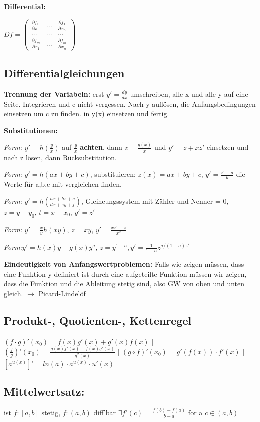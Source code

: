 \documentclass[a3paper, ngerman, 8pt]{article}
\begin{document}
\begin{multicols*}{3}
\textbf{Differential:}

$Df=\begin{pmatrix}
\frac{\partial f_1}{\partial x_1} & ... & \frac{\partial f_1}{\partial x_n}\\
... & ...& ...\\
\frac{\partial f_m}{\partial x_1} & ... & \frac{\partial f_m}{\partial x_n}
\end{pmatrix}$


\subsection*{Differentialgleichungen}
\textbf{Trennung der Variabeln:} erst $y'=\frac{dy}{dx}$ umschreiben, alle x und alle y auf eine Seite. Integrieren und c nicht vergessen. Nach y auflösen, die Anfangsbedingungen einsetzen um c zu finden. in y(x) einsetzen und fertig. 

\textbf{Substitutionen:} 

\textit{Form:} $y'=h(\frac{y}{x})$ auf $\frac{y}{x}$ \textbf{achten}, dann $z=\frac{y(x)}{x}$ und $y'=z+xz'$ einsetzen und nach z lösen, dann Rücksubstitution. 

\textit{Form:} $y'=h(ax+by+c)$, substituieren: $z(x)=ax+by+c$, $y'=\frac{z'-a}{b}$ die Werte für a,b,c mit vergleichen finden. 

\textit{Form:} $y'=h(\frac{ax+bx+c}{dx+ey+f})$, Gleihcungssystem mit Zähler und Nenner = 0, $z=y-y_0$, $t=x-x_0$, $y'=z'$

\textit{Form:} $y'=\frac{x}{y}h(xy)$, $z=xy$, $y'=\frac{xz'-z}{x^2}$

\textit{Form:}$y'=h(x)y+g(x)y^a$, $z=y^{1-a}, y'=\frac{1}{1-a}z^{a/(1-a)z'}$

\textbf{Eindeutigkeit von Anfangswertproblemen:} Falls wie zeigen müssen, dass eine Funktion y definiert ist durch eine aufgeteilte Funktion müssen wir zeigen, dass die Funktion und die Ableitung stetig sind, also GW von oben und unten gleich. $\to$ Picard-Lindelöf


\subsection*{Produkt-, Quotienten-, Kettenregel} $(f\cdot g)'(x_0) = f(x)g'(x)+g'(x)f(x)$ $\big \vert$  $(\frac{f}{g})'(x_0) = \frac{g(x)f'(x)-f(x)g'(x)}{g^2(x)}$ $\big \vert$ $(g\circ f)'(x_0)=g'(f(x))\cdot f'(x)$ $\big \vert$ $[a^{u(x)}]'= ln(a)\cdot a^{u(x)}\cdot u'(x)$

\subsection*{Mittelwertsatz:} ist $f: [a,b]$ stetig, $f:(a,b)$ diff'bar $\exists f'(c)=\frac{f(b)-f(a)}{b-a}$ for a $c\in (a,b)$


\end{multicols*}
\end{document}
